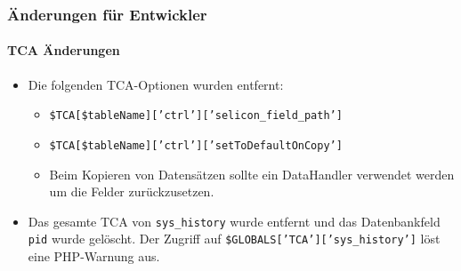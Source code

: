 \begin{frame}[fragile]
	\frametitle{Änderungen für Entwickler}
	\framesubtitle{TCA Änderungen}

	\begin{itemize}
		\item Die folgenden TCA-Optionen wurden entfernt:

			\begin{itemize}
				\item \texttt{\$TCA[\$tableName]['ctrl']['selicon\_field\_path']}
				\item \texttt{\$TCA[\$tableName]['ctrl']['setToDefaultOnCopy']}
			\end{itemize}

			\begin{itemize}\smaller
				\item[\ding{228}] Beim Kopieren von Datensätzen sollte ein DataHandler verwendet werden um die Felder zurückzusetzen.
			\end{itemize}\normalsize

		\item Das gesamte TCA von \texttt{sys\_history} wurde entfernt und das Datenbankfeld \texttt{pid} wurde gelöscht.
			Der Zugriff auf \texttt{\$GLOBALS['TCA']['sys\_history']} löst eine PHP-Warnung aus.

	\end{itemize}

\end{frame}


